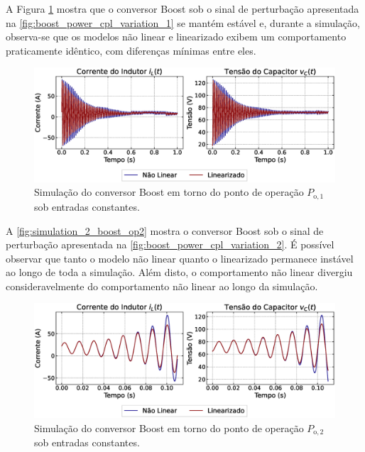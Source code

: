 A Figura \ref{fig:simulation_2_boost_op1} mostra que o conversor Boost sob o sinal de perturbação apresentada na \autoref{fig:boost_power_cpl_variation_1} se mantém estável e, durante a simulação, observa-se que os modelos não linear e linearizado exibem um comportamento praticamente idêntico, com diferenças mínimas entre eles.

 
\begin{figure}[H]
  \centering
  \captionsetup{justification=centering}
  \includegraphics[width=1.\textwidth]{figuras/boost/sim2/op1/result.eps}
  \caption{Simulação do conversor Boost em torno do ponto de operação $P_{\mathrm{o}, 1}$ sob entradas constantes.}
  \label{fig:simulation_2_boost_op1}
\end{figure}

A \autoref{fig:simulation_2_boost_op2} mostra o conversor Boost sob o sinal de perturbação apresentada na \autoref{fig:boost_power_cpl_variation_2}. É possível observar que tanto o modelo não linear quanto o linearizado permanece instável ao longo de toda a simulação. Além disto, o comportamento não linear  divergiu consideravelmente do comportamento não linear ao longo da simulação.

\begin{figure}[H]
  \centering
  \captionsetup{justification=centering}
  \includegraphics[width=1.\textwidth]{figuras/boost/sim2/op2/result.eps}
  \caption{Simulação do conversor Boost em torno do ponto de operação $P_{\mathrm{o}, 2}$ sob entradas constantes.}
  \label{fig:simulation_2_boost_op2}
\end{figure}